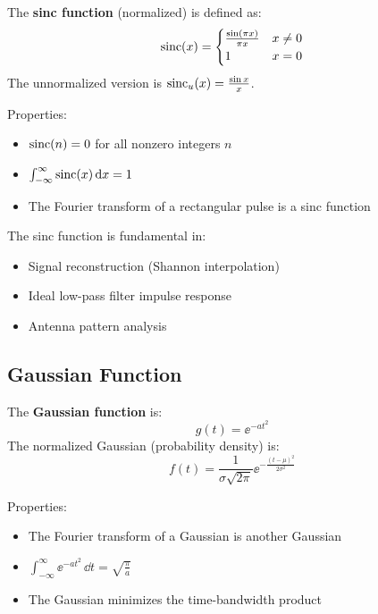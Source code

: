 \begin{definitionbox}[title=Definition 10.11: Sinc Function]
The \textbf{sinc function} (normalized) is defined as:
\begin{equation}
\operatorname{sinc}(x) = \begin{cases} \frac{\sin(\pi x)}{\pi x} & x \neq 0 \\ 1 & x = 0 \end{cases}
\end{equation}
The unnormalized version is $\operatorname{sinc}_u(x) = \frac{\sin x}{x}$.
\end{definitionbox}

Properties:
\begin{itemize}
    \item $\operatorname{sinc}(n) = 0$ for all nonzero integers $n$
    \item $\int_{-\infty}^{\infty} \operatorname{sinc}(x) \, \mathrm{d} x = 1$
    \item The Fourier transform of a rectangular pulse is a sinc function
\end{itemize}

The sinc function is fundamental in:
\begin{itemize}
    \item Signal reconstruction (Shannon interpolation)
    \item Ideal low-pass filter impulse response
    \item Antenna pattern analysis
\end{itemize}

\subsection{Gaussian Function}

\begin{definitionbox}[title=Definition 10.12: Gaussian Function]
The \textbf{Gaussian function} is:
\begin{equation}
g(t) = \ee^{-at^2}
\end{equation}
The normalized Gaussian (probability density) is:
\begin{equation}
f(t) = \frac{1}{\sigma\sqrt{2\pi}}\ee^{-\frac{(t-\mu)^2}{2\sigma^2}}
\end{equation}
\end{definitionbox}

Properties:
\begin{itemize}
    \item The Fourier transform of a Gaussian is another Gaussian
    \item $\int_{-\infty}^{\infty} \ee^{-at^2} \, \dd t = \sqrt{\frac{\pi}{a}}$
    \item The Gaussian minimizes the time-bandwidth product
\end{itemize}

